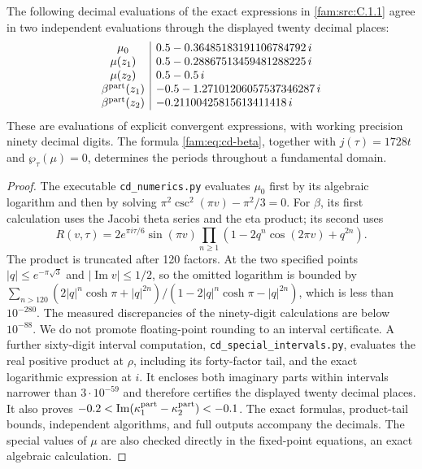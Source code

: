 \begin{proposition}\label{fam:src:C.1.2}\label{fam:st:C.1.2}
The following decimal evaluations of the exact expressions in \ref{fam:src:C.1.1} agree
in two independent evaluations through the displayed twenty decimal places:
\[
\begin{array}{c|l}
\mu_0&0.5-0.36485183191106784792\,i\\
\mu(z_1)&0.5-0.28867513459481288225\,i\\
\mu(z_2)&0.5-0.5\,i\\
\beta^{\rm part}(z_1)&-0.5-1.27101206057537346287\,i\\
\beta^{\rm part}(z_2)&-0.21100425815613411418\,i
\end{array}
\]
These are evaluations of explicit convergent expressions, with working
precision ninety decimal digits. The formula \eqref{fam:eq:cd-beta}, together
with \(j(\tau)=1728t\) and \(\wp_\tau(\mu)=0\), determines the periods
throughout a fundamental domain.
\end{proposition}

\begin{proof}
The executable \texttt{cd\_numerics.py} evaluates \(\mu_0\) first by its
algebraic logarithm and then by solving
\(\pi^2\csc^2(\pi v)-\pi^2/3=0\). For \(\beta\), its first calculation uses
the Jacobi theta series and the eta product; its second uses
\[
 R(v,\tau)=2e^{\pi i\tau/6}\sin(\pi v)
 \prod_{n\geq1}(1-2q^n\cos(2\pi v)+q^{2n}).
\]
The product is truncated after 120 factors. At the two specified points
\(|q|\leq e^{-\pi\sqrt3}\) and \(|\operatorname{Im}v|\leq1/2\), so the
omitted logarithm is bounded by
\(\sum_{n>120}(2|q|^n\cosh\pi+|q|^{2n})/(1-2|q|^n\cosh\pi-|q|^{2n})\),
which is less than \(10^{-280}\). The measured discrepancies of the
ninety-digit calculations are below \(10^{-88}\). We do not promote floating-point rounding to an interval certificate.
A further sixty-digit interval computation, \texttt{cd\_special\_intervals.py},
evaluates the real positive product at $\rho$, including its forty-factor
tail, and the exact logarithmic expression at $i$. It encloses both
imaginary parts within intervals narrower than $3\cdot10^{-59}$ and
therefore certifies the displayed twenty decimal places. It also proves
$-0.2<\operatorname{Im}(\kappa_1^{\rm part}-\kappa_2^{\rm part})<-0.1$.
The exact formulas, product-tail bounds, independent algorithms, and
full outputs accompany the decimals. The special values of \(\mu\) are also checked directly in
the fixed-point equations, an exact algebraic calculation.
\end{proof}

